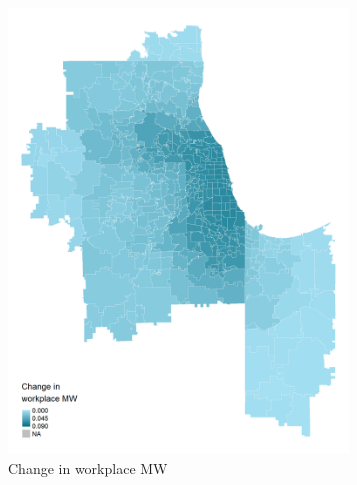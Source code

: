 \documentclass[aspectratio=169, t]{beamer}
\begin{document}
\begin{frame}[label = example_pred_chi_07_2019]
\begin{figure}
\begin{subfigure}{0.33\textwidth}
                         \includegraphics[width = 0.99\textwidth]{maps_events/output/chicago2019-6_wkp_mw.png}
            \caption*{Change in workplace MW}
        \end{subfigure}
        \begin{subfigure}{0.33\textwidth}

\end{subfigure}
\end{figure}
\end{frame}
\end{document}
